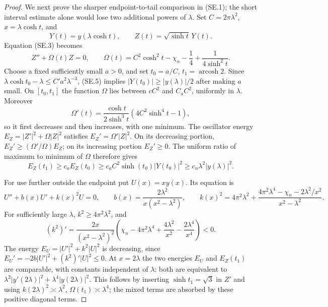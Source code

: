 \begin{proof}
We next prove the sharper endpoint-to-tail comparison
in (SE.1); the short interval estimate alone would lose
two additional powers of $\lambda$.
Set $C=2\pi\lambda^2$, $x=\lambda\cosh t$, and
\[
 Y(t)=y(\lambda\cosh t),\qquad Z(t)=\sqrt{\sinh t}\,Y(t).
\]
Equation (SE.3) becomes
\[
 Z''+\Omega(t)Z=0,\qquad
 \Omega(t)=C^2\cosh^2t-\chi_n-\frac14
                                  +\frac1{4\sinh^2t}.
                                                        \tag{SE.6}
\]
Choose a fixed sufficiently small $a>0$, and set
$t_0=a/C$, $t_1=\operatorname{arcosh}2$.
Since $\lambda\cosh t_0-\lambda\leq C'a^2\lambda^{-3}$,
(SE.5) implies
$|Y(t_0)|\geq|y(\lambda)|/2$ after making $a$ small.
On $[t_0,t_1]$ the function $\Omega$ lies between
$cC^2$ and $C_aC^2$, uniformly in $\lambda$.
Moreover
\[
 \Omega'(t)=\frac{\cosh t}{2\sinh^3t}
                              (4C^2\sinh^4t-1),    \tag{SE.7}
\]
so it first decreases and then increases, with one
minimum.  The oscillator energy
$E_Z=|Z'|^2+\Omega|Z|^2$ satisfies $E_Z'=\Omega'|Z|^2$.
On its decreasing portion,
$E_Z'\geq(\Omega'/\Omega)E_Z$; on its increasing
portion $E_Z'\geq0$.
The uniform ratio of maximum to minimum of $\Omega$
therefore gives
\[
 E_Z(t_1)\geq c_aE_Z(t_0)
       \geq c_a C^2\sinh(t_0)|Y(t_0)|^2
       \geq c_n\lambda^2|y(\lambda)|^2.           \tag{SE.8}
\]

For use further outside the endpoint put $U(x)=xy(x)$.
Its equation is
\[
 U''+b(x)U'+k(x)^2U=0,\qquad
 b(x)=\frac{2\lambda^2}{x(x^2-\lambda^2)},\qquad
 k(x)^2=4\pi^2\lambda^2+
      \frac{4\pi^2\lambda^4-\chi_n-2\lambda^2/x^2}
                                    {x^2-\lambda^2}.
                                                        \tag{SE.9}
\]
For sufficiently large $\lambda$, $k^2\geq4\pi^2\lambda^2$,
and
\[
 (k^2)'=\frac{2x}{(x^2-\lambda^2)^2}
     \left(\chi_n-4\pi^2\lambda^4
                     +\frac{4\lambda^2}{x^2}
                     -\frac{2\lambda^4}{x^4}\right)<0.
                                                        \tag{SE.10}
\]
The energy $E_U=|U'|^2+k^2|U|^2$ is decreasing, since
$E_U'=-2b|U'|^2+(k^2)'|U|^2\leq0$.
At $x=2\lambda$ the two energies $E_U$ and $E_Z(t_1)$
are comparable, with constants independent of $\lambda$:
both are equivalent to
$\lambda^2|y'(2\lambda)|^2+\lambda^4|y(2\lambda)|^2$.
This follows by inserting $\sinh t_1=\sqrt3$ in
$Z'$ and using $k(2\lambda)^2\asymp\lambda^2$,
$\Omega(t_1)\asymp\lambda^4$; the mixed terms are
absorbed by these positive diagonal terms.


\end{proof}
